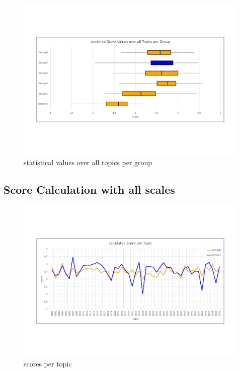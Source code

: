 \begin{figure}[H]
	\centering
	\includegraphics[trim=0 150 0 150, width=\textwidth]{img/box.pdf}
	\caption{statistical values over all topics per group}
	\label{fig:svg}
\end{figure}


\subsection{Score Calculation with all scales}

\begin{figure}[H]
	\centering
	\includegraphics[trim=0 150 0 150, width=\textwidth]{img/score_per_topic.pdf}
	\caption{scores per topic}
	\label{fig:spt}
\end{figure}


